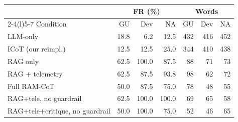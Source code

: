 \begin{tabular}{@{}lrrrrrr@{}}
\toprule
 & \multicolumn{3}{c}{FR (\%)} & \multicolumn{3}{c}{Words} \\ \cmidrule(lr){2-4}\cmidrule(l){5-7}
Condition & GU & Dev & NA & GU & Dev & NA \\
\midrule
LLM-only & 18.8 & 6.2 & 12.5 & 432 & 416 & 452 \\
ICoT (our reimpl.) & 12.5 & 12.5 & 25.0 & 344 & 410 & 438 \\
RAG only & 62.5 & 100.0 & 87.5 & 88 & 71 & 73 \\
RAG + telemetry & 62.5 & 87.5 & 93.8 & 98 & 62 & 72 \\
Full RAM-CoT & 50.0 & 87.5 & 75.0 & 78 & 48 & 55 \\
RAG+tele, no guardrail & 62.5 & 100.0 & 100.0 & 69 & 65 & 58 \\
RAG+tele+critique, no guardrail & 50.0 & 100.0 & 75.0 & 52 & 46 & 65 \\
\bottomrule
\end{tabular}